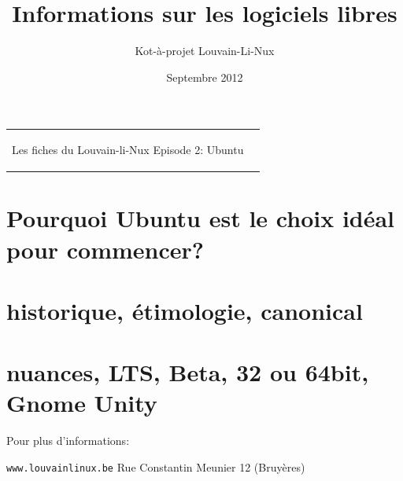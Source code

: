 \documentclass[12pt,a4paper]{article}
\title{Informations sur les logiciels libres}
\author{Kot-à-projet Louvain-Li-Nux}
\date{Septembre 2012}
\begin{document}

\begin{tabular}{p{12cm}r}

\begin{center}{\Large Les fiches du Louvain-li-Nux\linebreak \linebreak
\LARGE Episode 2: Ubuntu}\end{center}
&
\usebox{\logollnux}

\end{tabular}


\section*{Pourquoi Ubuntu est le choix idéal pour commencer?}



\section*{historique, étimologie, canonical}



\section*{nuances, LTS, Beta, 32 ou 64bit, Gnome Unity}



Pour plus d'informations:

\begin{center}\texttt{www.louvainlinux.be} \hspace{0.5cm}Rue Constantin Meunier 12 (Bruyères)\end{center}
                                                                                                                       
\end{document}
